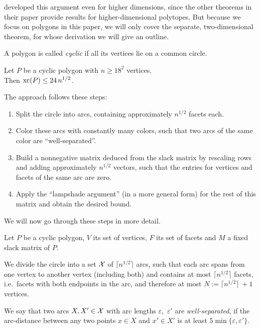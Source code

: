\citeauthor{kwan2020extension} developed this argument even for higher dimensions, since the other theorems in their paper provide results for higher-dimensional polytopes. But because we focus on polygons in this paper, we will only cover the separate, two-dimensional theorem, for whose derivation we will give an outline.

\begin{definition}
  A polygon is called \emph{cyclic} if all its vertices lie on a common circle.
\end{definition}

\begin{theorem}\label{theorem:cyclic-xc}
  Let $P$ be a cyclic polygon with $n \geq 18^2$ vertices.\\
  Then $\operatorname{xc}(P) \leq 24\,n^{1/2}$.
\end{theorem}

The approach follows these steps:

\begin{enumerate}
  \item Split the circle into arcs, containing approximately $n^{1/2}$ facets each.
  \item Color these arcs with constantly many colors, such that two arcs of the same color are ``well-separated''.
  \item Build a nonnegative matrix deduced from the slack matrix by rescaling rows and adding approximately $n^{1/2}$ vectors, such that the entries for vertices and facets of the same arc are zero.
  \item Apply the ``lampshade argument'' (in a more general form) for the rest of this matrix and obtain the desired bound.
\end{enumerate}

We will now go through these steps in more detail.

Let $P$ be a cyclic polygon, $V$ its set of vertices, $F$ its set of facets and $M$ a fixed slack matrix of $P$.

We divide the circle into a set $\mathcal{X}$ of $\lceil n^{1/2} \rceil$ arcs, such that each arc spans from one vertex to another vertex (including both) and contains at most $\lceil n^{1/2} \rceil$ facets, i.e.\ facets with both endpoints in the arc, and therefore at most $N := \lceil n^{1/2} \rceil\ + 1$ vertices.

\begin{definition}
  We say that two arcs $X,X' \in \mathcal{X}$ with arc lengths $\varepsilon$,~$\varepsilon'$ are \emph{well-separated}, if the arc-distance between any two points $x \in X$ and $x' \in X'$ is at least $5 \min\{\varepsilon, \varepsilon'\}$.
\end{definition}

